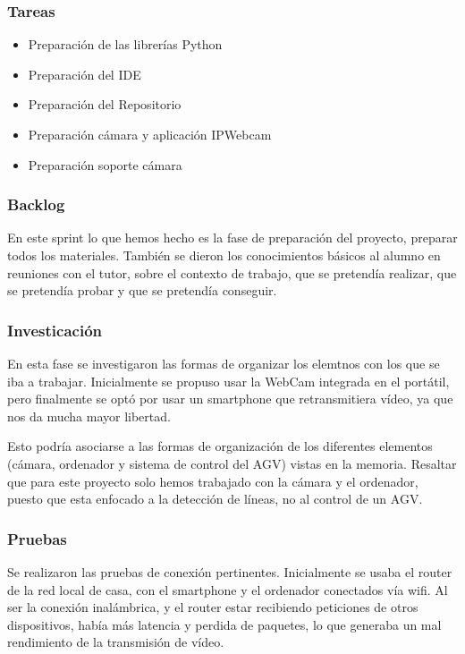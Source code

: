 \subsubsection{Tareas}
\begin{itemize}
	\item Preparación de las librerías Python
	\item Preparación del IDE
	\item Preparación del Repositorio
	\item Preparación cámara y aplicación IPWebcam
	\item Preparación soporte cámara 
\end{itemize}
\subsubsection{Backlog}
En este sprint lo que hemos hecho es la fase de preparación del proyecto, preparar todos los materiales. También se dieron los conocimientos básicos al alumno en reuniones con el tutor, sobre el contexto de trabajo, que se pretendía realizar, que se pretendía probar y que se pretendía conseguir. 

\subsubsection{Investicación}
En esta fase se investigaron las formas de organizar los elemtnos con los que se iba a trabajar. Inicialmente se propuso usar la WebCam integrada en el portátil, pero finalmente se optó por usar un smartphone que retransmitiera vídeo, ya que nos da mucha mayor libertad. 

Esto podría asociarse a las formas de organización de los diferentes elementos (cámara, ordenador y sistema de control del AGV) vistas en la memoria. Resaltar que para este proyecto solo hemos trabajado con la cámara y el ordenador, puesto que esta enfocado a la detección de líneas, no al control de un AGV.

\subsubsection{Pruebas}

Se realizaron las pruebas de conexión pertinentes. Inicialmente se usaba el router de la red local de casa, con el smartphone y el ordenador conectados vía wifi. Al ser la conexión inalámbrica, y el router estar recibiendo peticiones de otros dispositivos, había más latencia y perdida de paquetes, lo que generaba un mal rendimiento de la transmisión de vídeo.


